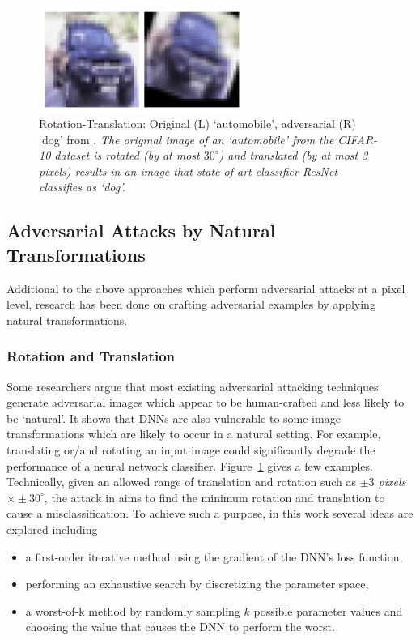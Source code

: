 \begin{figure}
    \centering
    \includegraphics[width=0.6\textwidth]{images/deepLearning/AdversarialAttack/CIFAR10_rottran.png}
    \caption{Rotation-Translation: Original (L) `automobile', adversarial (R) `dog' from \cite{engstrom2017rotation}. {\em The original image of an `automobile' from the CIFAR-10 dataset is rotated (by at most $30^\circ$) and translated (by at most 3 pixels) results in an image that state-of-art classifier ResNet~\cite{he2016deep} classifies as `dog'.}}
    \label{fig:rottran}
\end{figure}

\subsection{Adversarial Attacks by Natural Transformations}\label{sec:naturalAdvAttacks}

Additional to the above approaches which perform adversarial attacks at a pixel level, research has been done on crafting adversarial examples by applying natural transformations.

\subsubsection{Rotation and Translation}

Some researchers \cite{engstrom2017rotation} argue that most existing adversarial attacking techniques generate adversarial images which appear to be human-crafted and less likely to be `natural'. It shows that DNNs are also vulnerable to some image transformations which are likely to occur in a natural setting. For example, translating or/and rotating an input image could significantly degrade the performance of a neural network classifier. Figure~\ref{fig:rottran} gives a few examples. 
%
Technically, given an allowed range of translation and rotation such as {\em $\pm3$ pixels $\times \pm 30^\circ$}, the attack in \cite{engstrom2017rotation} aims to find the minimum rotation and translation to cause a misclassification. To achieve such a purpose, in this work several ideas are explored including
\begin{itemize}
    \item a first-order iterative method using the gradient of the DNN's loss function,
    \item performing an exhaustive search by discretizing the parameter space,
    \item a worst-of-k method by randomly sampling $k$ possible parameter values and choosing the value that causes the DNN to perform the worst. 
\end{itemize}

